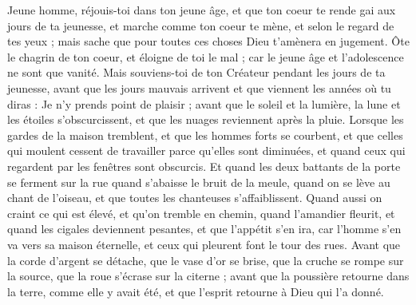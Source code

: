 \begin{multicols}{2}
\VerseOne{}Jeune homme, réjouis-toi dans ton jeune âge, et que ton coeur te rende gai aux jours de ta jeunesse, et marche comme ton coeur te mène, et selon le regard de tes yeux ; mais sache que pour toutes ces choses Dieu t'amènera en jugement. 
Ôte le chagrin de ton coeur, et éloigne de toi le mal ; car le jeune âge et l'adolescence ne sont que vanité. 
Mais souviens-toi de ton Créateur pendant les jours de ta jeunesse, avant que les jours mauvais arrivent et que viennent les années où tu diras : Je n'y prends point de plaisir ;
avant que le soleil et la lumière, la lune et les étoiles s'obscurcissent, et que les nuages reviennent après la pluie.
Lorsque les gardes de la maison tremblent, et que les hommes forts se courbent, et que celles qui moulent cessent de travailler parce qu'elles sont diminuées, et quand ceux qui regardent par les fenêtres sont obscurcis.
Et quand les deux battants de la porte se ferment sur la rue quand s'abaisse le bruit de la meule, quand on se lève au chant de l'oiseau, et que toutes les chanteuses s'affaiblissent.
Quand aussi on craint ce qui est élevé, et qu'on tremble en chemin, quand l'amandier fleurit, et quand les cigales deviennent pesantes, et que l'appétit s'en ira, car l'homme s'en va vers sa maison éternelle, et ceux qui pleurent font le tour des rues.
Avant que la corde d'argent se détache, que le vase d'or se brise, que la cruche se rompe sur la source, que la roue s'écrase sur la citerne ;
avant que la poussière retourne dans la terre, comme elle y avait été, et que l'esprit retourne à Dieu qui l'a donné.

\end{multicols}
